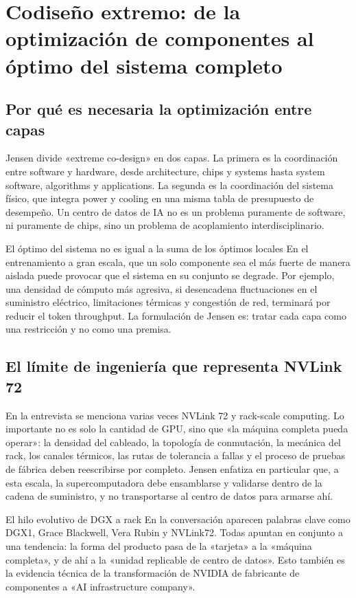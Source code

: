 \documentclass[a4paper]{article}
\begin{document}
\section{Codiseño extremo: de la optimización de componentes al óptimo del sistema completo}

\subsection{Por qué es necesaria la optimización entre capas}

Jensen divide «extreme co-design» en dos capas. La primera es la coordinación entre software y hardware, desde architecture, chips y systems hasta system software, algorithms y applications. La segunda es la coordinación del sistema físico, que integra power y cooling en una misma tabla de presupuesto de desempeño. Un centro de datos de IA no es un problema puramente de software, ni puramente de chips, sino un problema de acoplamiento interdisciplinario.

\begin{importantbox}{El óptimo del sistema no es igual a la suma de los óptimos locales}
En el entrenamiento a gran escala, que un solo componente sea el más fuerte de manera aislada puede provocar que el sistema en su conjunto se degrade. Por ejemplo, una densidad de cómputo más agresiva, si desencadena fluctuaciones en el suministro eléctrico, limitaciones térmicas y congestión de red, terminará por reducir el token throughput. La formulación de Jensen es: tratar cada capa como una restricción y no como una premisa.
\end{importantbox}

\subsection{El límite de ingeniería que representa NVLink 72}

En la entrevista se menciona varias veces NVLink 72 y rack-scale computing. Lo importante no es solo la cantidad de GPU, sino que «la máquina completa pueda operar»: la densidad del cableado, la topología de conmutación, la mecánica del rack, los canales térmicos, las rutas de tolerancia a fallas y el proceso de pruebas de fábrica deben reescribirse por completo. Jensen enfatiza en particular que, a esta escala, la supercomputadora debe ensamblarse y validarse dentro de la cadena de suministro, y no transportarse al centro de datos para armarse ahí.

\begin{knowledgebox}{El hilo evolutivo de DGX a rack}
En la conversación aparecen palabras clave como DGX1, Grace Blackwell, Vera Rubin y NVLink72. Todas apuntan en conjunto a una tendencia: la forma del producto pasa de la «tarjeta» a la «máquina completa», y de ahí a la «unidad replicable de centro de datos». Esto también es la evidencia técnica de la transformación de NVIDIA de fabricante de componentes a «AI infrastructure company».
\end{knowledgebox}
\end{document}
